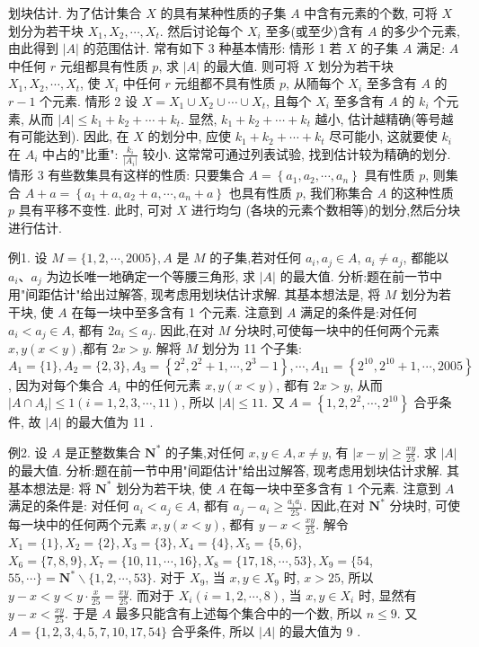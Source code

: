 
划块估计.
为了估计集合 $X$ 的具有某种性质的子集 $A$ 中含有元素的个数, 可将 $X$ 划分为若干块 $X_1, X_2, \cdots, X_t$. 然后讨论每个 $X_i$ 至多(或至少)含有 $A$ 的多少个元素, 由此得到 $|A|$ 的范围估计.
常有如下 3 种基本情形:
情形 1 若 $X$ 的子集 $A$ 满足: $A$ 中任何 $r$ 元组都具有性质 $p$, 求 $|A|$ 的最大值.
则可将 $X$ 划分为若干块 $X_1, X_2, \cdots, X_t$, 使 $X_i$ 中任何 $r$ 元组都不具有性质 $p$, 从陑每个 $X_i$ 至多含有 $A$ 的 $r-1$ 个元素.
情形 2 设 $X=X_1 \cup X_2 \cup \cdots \cup X_t$, 且每个 $X_i$ 至多含有 $A$ 的 $k_i$ 个元素, 从而 $|A| \leqslant k_1+k_2+\cdots+k_t$. 显然, $k_1+k_2+\cdots+k_t$ 越小, 估计越精确(等号越有可能达到). 因此, 在 $X$ 的划分中, 应使 $k_1+k_2+\cdots+k_t$ 尽可能小, 这就要使 $k_i$ 在 $A_i$ 中占的"比重": $\frac{k_i}{\left|A_i\right|}$ 较小.
这常常可通过列表试验, 找到估计较为精确的划分.
情形 3 有些数集具有这样的性质: 只要集合 $A=\left\{a_1, a_2, \cdots, a_n\right\}$ 具有性质 $p$, 则集合 $A+a=\left\{a_1+a, a_2+a, \cdots, a_n+a\right\}$ 也具有性质 $p$, 我们称集合 $A$ 的这种性质 $p$ 具有平移不变性.
此时, 可对 $X$ 进行均匀 (各块的元素个数相等)的划分,然后分块进行估计.



例1. 设 $M=\{1,2, \cdots, 2005\}, A$ 是 $M$ 的子集,若对任何 $a_i, a_j \in A$, $a_i \neq a_j$, 都能以 $a_i 、 a_j$ 为边长唯一地确定一个等腰三角形, 求 $|A|$ 的最大值.
分析:题在前一节中用"间距估计"给出过解答, 现考虑用划块估计求解.
其基本想法是, 将 $M$ 划分为若干块, 使 $A$ 在每一块中至多含有 1 个元素.
注意到 $A$ 满足的条件是:对任何 $a_i<a_j \in A$, 都有 $2 a_i \leqslant a_j$. 因此,在对 $M$ 分块时,可使每一块中的任何两个元素 $x, y(x<y)$,都有 $2 x>y$.
解将 $M$ 划分为 11 个子集: $A_1=\{1\}, A_2=\{2,3\}, A_3=\left\{2^2, 2^2+\right. \left.1, \cdots, 2^3-1\right\}, \cdots, A_{11}=\left\{2^{10}, 2^{10}+1, \cdots, 2005\right\}$, 因为对每个集合 $A_i$ 中的任何元素 $x, y(x<y)$, 都有 $2 x>y$, 从而 $\left|A \cap A_i\right| \leqslant 1(i=1,2,3, \cdots, 11)$, 所以 $|A| \leqslant 11$. 又 $A=\left\{1,2,2^2, \cdots, 2^{10}\right\}$ 合乎条件, 故 $|A|$ 的最大值为 11 .



例2. 设 $A$ 是正整数集合 $\mathbf{N}^*$ 的子集,对任何 $x, y \in A, x \neq y$, 有 $\mid x- y \mid \geqslant \frac{x y}{25}$. 求 $|A|$ 的最大值.
分析:题在前一节中用"间距估计"给出过解答, 现考虑用划块估计求解.
其基本想法是: 将 $\mathbf{N}^*$ 划分为若干块, 使 $A$ 在每一块中至多含有 1 个元素.
注意到 $A$ 满足的条件是: 对任何 $a_i<a_j \in A$, 都有 $a_j-a_i \geqslant \frac{a_i a_i}{25}$. 因此,在对 $\mathbf{N}^*$ 分块时, 可使每一块中的任何两个元素 $x, y(x<y)$, 都有 $y-x<\frac{x y}{25}$.
解令 $X_1=\{1\}, X_2=\{2\}, X_3=\{3\}, X_4=\{4\}, X_5=\{5,6\}$, $X_6=\{7,8,9\}, X_7=\{10,11, \cdots, 16\}, X_8=\{17,18, \cdots, 53\}, X_9=\{54$, $55, \cdots\}=\mathbf{N}^* \backslash\{1,2, \cdots, 53\}$.
对于 $X_9$, 当 $x, y \in X_9$ 时, $x>25$, 所以 $y-x<y<y \cdot \frac{x}{25}=\frac{x y}{25}$. 而对于 $X_i(i=1,2, \cdots, 8)$, 当 $x, y \in X_i$ 时, 显然有 $y-x<\frac{x y}{25}$. 于是 $A$ 最多只能含有上述每个集合中的一个数, 所以 $n \leqslant 9$.
又 $A=\{1,2,3,4,5,7,10,17,54\}$ 合乎条件, 所以 $|A|$ 的最大值为 9 .



